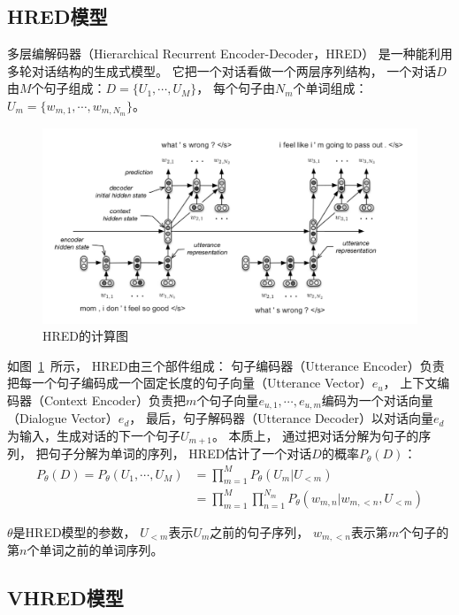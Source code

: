 \subsection{HRED模型}\label{subsec:HRED}
多层编解码器（Hierarchical Recurrent Encoder-Decoder，HRED）
是一种能利用多轮对话结构的生成式模型。
它把一个对话看做一个两层序列结构，
一个对话$D$由$M$个句子组成：$D = \{ U_1, \cdots, U_M \}$，
每个句子由$N_m$个单词组成：$U_m = \{ w_{m, 1}, \cdots, w_{m, N_m} \}$。
\begin{figure}[H]
    \centering
    \includegraphics[width=\textwidth]{figure/HRED.png}
    \caption{HRED的计算图}
    \label{fig:HRED_computation_graph}
\end{figure}

如图~\ref{fig:HRED_computation_graph}~所示，
HRED由三个部件组成：
句子编码器（Utterance Encoder）负责把每一个句子编码成一个固定长度的句子向量（Utterance Vector）$e_u$，
上下文编码器（Context Encoder）负责把$m$个句子向量$e_{u,1}, \cdots, e_{u,m}$编码为一个对话向量（Dialogue Vector）$e_d$，
最后，句子解码器（Utterance Decoder）以对话向量$e_d$为输入，生成对话的下一个句子$U_{m+1}$。
本质上， 通过把对话分解为句子的序列， 把句子分解为单词的序列，
HRED估计了一个对话$D$的概率$P_{\theta}(D)$：
\begin{align}
    P_{\theta}(D) = P_{\theta}(U_1, \cdots, U_M) &= \prod_{m=1}^M P_{\theta}(U_m|U_{<m}) \\
    &= \prod_{m=1}^M \prod_{n=1}^{N_m} P_{\theta}( w_{m, n} |w_{m, <n}, U_{<m} )
\end{align}

$\theta$是HRED模型的参数，
$U_{<m}$表示$U_m$之前的句子序列，
$w_{m, <n}$表示第$m$个句子的第$n$个单词之前的单词序列。


\subsection{VHRED模型}\label{subsec:VHRED}

